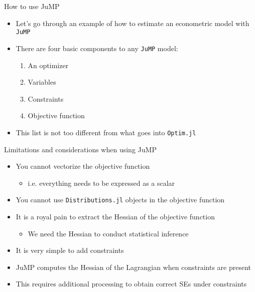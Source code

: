 \documentclass[aspectratio=169]{beamer}
\begin{document}
\begin{frame}

How to use JuMP

\bigskip{}

\begin{itemize}
\itemsep1.5em
\item<2-> Let's go through an example of how to estimate an econometric model with \texttt{JuMP}
\item<3-> There are four basic components to any \texttt{JuMP} model:
\bigskip\par
\begin{enumerate}
\itemsep1.5em
\item<4-> An optimizer
\item<5-> Variables
\item<6-> Constraints
\item<7-> Objective function
\end{enumerate}
\item<8-> This list is not too different from what goes into \texttt{Optim.jl}
\end{itemize}

\end{frame}

\begin{frame}

Limitations and considerations when using JuMP

\bigskip{}

\begin{itemize}
\itemsep1.25em
\item<2-> You cannot vectorize the objective function
\bigskip\par
\begin{itemize}
\itemsep1.25em
\item i.e. everything needs to be expressed as a scalar
\end{itemize}
\item<3-> You cannot use \texttt{Distributions.jl} objects in the objective function
\item<4-> It is a royal pain to extract the Hessian of the objective function
\bigskip\par
\begin{itemize}
\itemsep1.25em
\item We need the Hessian to conduct statistical inference
\end{itemize}
\item<5-> It is very simple to add constraints
\item<6-> JuMP computes the Hessian of the Lagrangian when constraints are present
\item<7-> This requires additional processing to obtain correct SEs under constraints
\end{itemize}

\end{frame}
\end{document}
